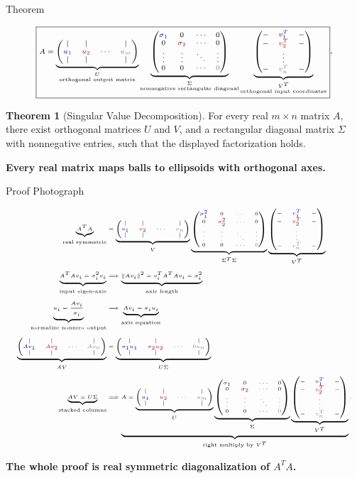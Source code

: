 \documentclass[10pt]{beamer}
\theoremstyle{definition}
\newtheorem{thm}{Theorem}[section]
\newcommand{\x}[1]{\alert{\textbf{#1}}}
\newcommand{\rd}[1]{{\color{red!70!black}#1}}
\newcommand{\bl}[1]{{\color{blue!70!black}#1}}
\newcommand{\gry}[1]{{\color{gray}#1}}
\newcommand{\Vcols}{\begin{pmatrix}|&|& &|\\ \bl{v_1}&\rd{v_2}&\cdots&\gry{v_n}\\ |&|& &|\end{pmatrix}}
\newcommand{\Ucols}{\begin{pmatrix}|&|& &|\\ \bl{u_1}&\rd{u_2}&\cdots&\gry{u_m}\\ |&|& &|\end{pmatrix}}
\newcommand{\Vrows}{\begin{pmatrix}-&\bl{v_1^T}&-\\ -&\rd{v_2^T}&-\\ &\vdots&\\ -&\gry{v_n^T}&-\end{pmatrix}}
\newcommand{\Sigdisplay}{\begin{pmatrix}\bl{\sigma_1}&0&\cdots&0\\ 0&\rd{\sigma_2}&\cdots&0\\ \vdots&\vdots&\ddots&\vdots\\ 0&0&\cdots&\gry{0}\end{pmatrix}}
\newcommand{\SigTsigdisplay}{\begin{pmatrix}\bl{\sigma_1^2}&0&\cdots&0\\ 0&\rd{\sigma_2^2}&\cdots&0\\ \vdots&\vdots&\ddots&\vdots\\ 0&0&\cdots&\gry{0}\end{pmatrix}}
\begin{document}
\begin{frame}[shrink=20]{Theorem}

\[
\scriptsize
\boxed{
A=
\underbrace{\Ucols}_{\substack{U\\\text{orthogonal output matrix}}}
\underbrace{\Sigdisplay}_{\substack{\Sigma\\\text{nonnegative rectangular diagonal}}}
\underbrace{\Vrows}_{\substack{V^T\\\text{orthogonal input coordinates}}}
}.
\]

\vfill

\begin{thm}[Singular Value Decomposition]
For every real $m\times n$ matrix $A$, there exist orthogonal matrices
$U$ and $V$, and a rectangular diagonal matrix $\Sigma$ with nonnegative
entries, such that the displayed factorization holds.
\end{thm}

\vfill

\begin{center}
\x{Every real matrix maps balls to ellipsoids with orthogonal axes.}
\end{center}

\end{frame}


\begin{frame}[shrink=18]{Proof Photograph}

\[
\tiny
\begin{aligned}
\underbrace{A^TA}_{\text{real symmetric}}
&=
\underbrace{\Vcols}_{V}
\underbrace{\SigTsigdisplay}_{\Sigma^T\Sigma}
\underbrace{\Vrows}_{V^T}\\[0.4em]
\underbrace{A^TA v_i=\sigma_i^2v_i}_{\text{input eigen-axis}}
&\Longrightarrow
\underbrace{\|Av_i\|^2=v_i^TA^TAv_i=\sigma_i^2}_{\text{axis length}}\\[0.4em]
\underbrace{u_i=\dfrac{Av_i}{\sigma_i}}_{\text{normalize nonzero output}}
&\Longrightarrow
\underbrace{Av_i=\sigma_i u_i}_{\text{axis equation}}\\[0.4em]
\underbrace{
\begin{pmatrix}|&|& &|\\
\bl{Av_1}&\rd{Av_2}&\cdots&\gry{Av_n}\\
|&|& &|
\end{pmatrix}}_{AV}
&=
\underbrace{
\begin{pmatrix}|&|& &|\\
\bl{\sigma_1u_1}&\rd{\sigma_2u_2}&\cdots&\gry{0u_n}\\
|&|& &|
\end{pmatrix}}_{U\Sigma}\\[0.4em]
\underbrace{AV=U\Sigma}_{\text{stacked columns}}
&\Longrightarrow
\underbrace{
A=
\underbrace{\Ucols}_{U}
\underbrace{\Sigdisplay}_{\Sigma}
\underbrace{\Vrows}_{V^T}
}_{\text{right multiply by }V^T}.
\end{aligned}
\]

\vfill

\begin{center}
\x{The whole proof is real symmetric diagonalization of $A^TA$.}
\end{center}

\end{frame}
\end{document}
